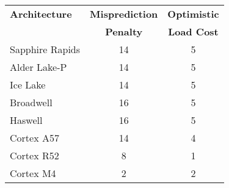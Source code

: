 \begin{tabular}{lcc}
\hline
\textbf{Architecture} & \textbf{Misprediction} & \textbf{Optimistic} \\
                      & \textbf{Penalty}       & \textbf{Load Cost} \\
\hline
Sapphire Rapids & 14 & 5 \\
Alder Lake-P    & 14 & 5 \\
Ice Lake        & 14 & 5 \\
Broadwell       & 16 & 5 \\
Haswell         & 16 & 5 \\
Cortex A57       & 14 & 4 \\
Cortex R52       & 8  & 1 \\
Cortex M4        & 2  & 2 \\
\hline
\end{tabular}
